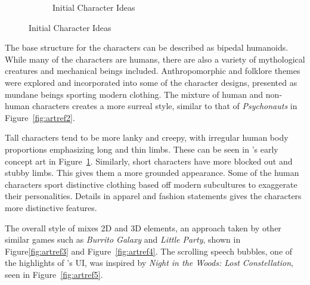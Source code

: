 \begin{figure}[H]
\begin{subfigure}{.45\textwidth}
  \caption{Initial Character Ideas}
  \label{fig:m4}
\end{subfigure}
\label{fig:mstyle}
\end{figure}

The base structure for the characters can be described as bipedal humanoids. While many of the characters are humans, there are also a variety of mythological creatures and mechanical beings included. Anthropomorphic and folklore themes were explored and incorporated into some of the character designs, presented as mundane beings sporting modern clothing. The mixture of human and non-human characters creates a more surreal style, similar to that of \textit{Psychonauts} in Figure~\ref{fig:artref2}.

Tall characters tend to be more lanky and creepy, with irregular human body proportions emphasizing long and thin limbs. These can be seen in \ourgame{}'s early concept art in Figure~\ref{fig:m4}. Similarly, short characters have more blocked out and stubby limbs. This gives them a more grounded appearance. Some of the human characters sport distinctive clothing based off modern subcultures to exaggerate their personalities. Details in apparel and fashion statements gives the characters more distinctive features.

The overall style of \ourgame{} mixes 2D and 3D elements, an approach taken by other similar games such as \textit{Burrito Galaxy} and \textit{Little Party}, shown in Figure\ref{fig:artref3} and Figure~\ref{fig:artref4}. The scrolling speech bubbles, one of the highlights of \ourgame{}'s UI, was inspired by \textit{Night in the Woods: Lost Constellation}, seen in Figure~\ref{fig:artref5}.

